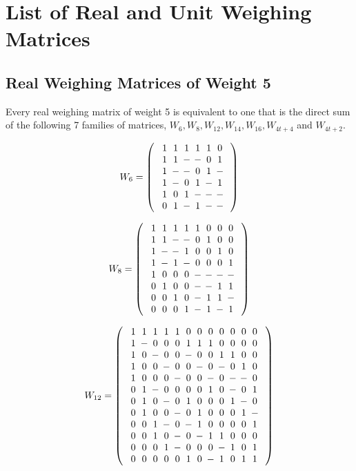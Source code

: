 \chapter[List of Real and Unit Weighing Matrices]{List of Real and Unit Weighing Matrices}
\label{app:real-and-unit-wm}

\section[Real Weighing Matrices of Weight 5]{Real Weighing Matrices of Weight 5}
\label{app:real-wm}

Every real weighing matrix of weight 5 is equivalent to one that is the direct sum of the following 7 families of matrices, $W_{6}, W_{8}, W_{12}, W_{14},W_{16},W_{4t+4}$ and $W_{4t+2}$.

$$W_6 =
\left(\begin{array}{c}
\Zp\Zp\Zp\Zp\Zp\Zz\\
\Zp\Zp\Zm\Zm\Zz\Zp\\
\Zp\Zm\Zm\Zz\Zp\Zm\\
\Zp\Zm\Zz\Zp\Zm\Zp\\
\Zp\Zz\Zp\Zm\Zm\Zm\\
\Zz\Zp\Zm\Zp\Zm\Zm
\end{array}\right)
$$

$$W_8 = 
\left(\begin{array}{c}
\Zp\Zp\Zp\Zp\Zp\Zz\Zz\Zz\\
\Zp\Zp\Zm\Zm\Zz\Zp\Zz\Zz\\
\Zp\Zm\Zm\Zp\Zz\Zz\Zp\Zz\\
\Zp\Zm\Zp\Zm\Zz\Zz\Zz\Zp\\
\Zp\Zz\Zz\Zz\Zm\Zm\Zm\Zm\\
\Zz\Zp\Zz\Zz\Zm\Zm\Zp\Zp\\
\Zz\Zz\Zp\Zz\Zm\Zp\Zp\Zm\\
\Zz\Zz\Zz\Zp\Zm\Zp\Zm\Zp
\end{array}\right)
$$

$$W_{12} = 
\left(\begin{array}{c}
\Zp\Zp\Zp\Zp\Zp\Zz\Zz\Zz\Zz\Zz\Zz\Zz\\
\Zp\Zm\Zz\Zz\Zz\Zp\Zp\Zp\Zz\Zz\Zz\Zz\\
\Zp\Zz\Zm\Zz\Zz\Zm\Zz\Zz\Zp\Zp\Zz\Zz\\
\Zp\Zz\Zz\Zm\Zz\Zz\Zm\Zz\Zm\Zz\Zp\Zz\\
\Zp\Zz\Zz\Zz\Zm\Zz\Zz\Zm\Zz\Zm\Zm\Zz\\
\Zz\Zp\Zm\Zz\Zz\Zz\Zz\Zp\Zz\Zm\Zz\Zp\\
\Zz\Zp\Zz\Zm\Zz\Zp\Zz\Zz\Zz\Zp\Zm\Zz\\
\Zz\Zp\Zz\Zz\Zm\Zz\Zp\Zz\Zz\Zz\Zp\Zm\\
\Zz\Zz\Zp\Zm\Zz\Zm\Zp\Zz\Zz\Zz\Zz\Zp\\
\Zz\Zz\Zp\Zz\Zm\Zz\Zm\Zp\Zp\Zz\Zz\Zz\\
\Zz\Zz\Zz\Zp\Zm\Zz\Zz\Zz\Zm\Zp\Zz\Zp\\
\Zz\Zz\Zz\Zz\Zz\Zp\Zz\Zm\Zp\Zz\Zp\Zp
\end{array}\right)$$

